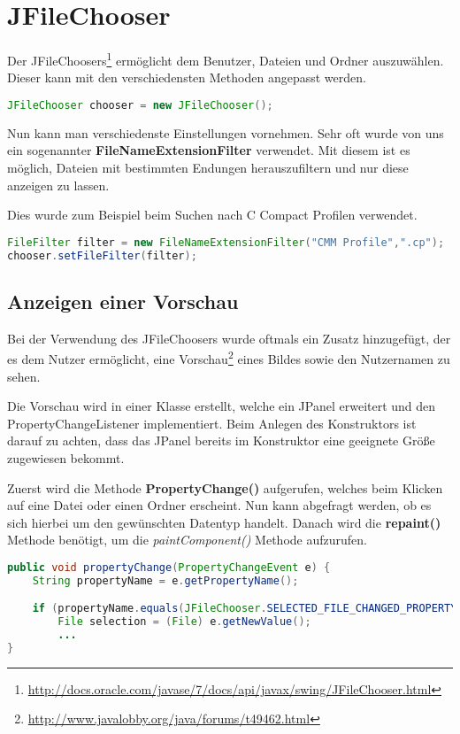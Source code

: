 \section{JFileChooser}
\label{sec:JFileChooser}

Der JFileChoosers\footnote{\url{http://docs.oracle.com/javase/7/docs/api/javax/swing/JFileChooser.html}} ermöglicht dem Benutzer, Dateien und Ordner auszuwählen. Dieser kann mit den verschiedensten Methoden angepasst werden.
\begin{lstlisting}[language=JAVA]
JFileChooser chooser = new JFileChooser();
\end{lstlisting}
    
Nun kann man verschiedenste Einstellungen vornehmen. Sehr oft wurde von uns ein sogenannter \textbf{FileNameExtensionFilter} verwendet. Mit diesem ist es möglich, Dateien mit bestimmten Endungen herauszufiltern und nur diese anzeigen zu lassen.

Dies wurde zum Beispiel beim Suchen nach C Compact Profilen verwendet.
\begin{lstlisting}[language=JAVA]
FileFilter filter = new FileNameExtensionFilter("CMM Profile",".cp");
chooser.setFileFilter(filter);
\end{lstlisting}



\subsection{Anzeigen einer Vorschau}
Bei der Verwendung des JFileChoosers wurde oftmals ein Zusatz hinzugefügt, der es dem Nutzer ermöglicht, eine Vorschau\footnote{\url{http://www.javalobby.org/java/forums/t49462.html}} eines Bildes sowie den Nutzernamen zu sehen.

Die Vorschau wird in einer Klasse erstellt, welche ein JPanel erweitert und den PropertyChangeListener implementiert. Beim Anlegen des Konstruktors ist darauf zu achten, dass das JPanel bereits im Konstruktor eine geeignete Größe zugewiesen bekommt.

Zuerst wird die Methode \textbf{PropertyChange()} aufgerufen, welches beim Klicken auf eine Datei oder einen Ordner erscheint. Nun kann abgefragt werden, ob es sich hierbei um den gewünschten Datentyp handelt. Danach wird die \textbf{repaint()} Methode benötigt, um die \textit{paintComponent()} Methode aufzurufen.
\begin{lstlisting}[language=JAVA]
public void propertyChange(PropertyChangeEvent e) {
	String propertyName = e.getPropertyName();

	if (propertyName.equals(JFileChooser.SELECTED_FILE_CHANGED_PROPERTY)) {
		File selection = (File) e.getNewValue();
		...
}
\end{lstlisting}

